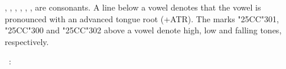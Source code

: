 \begin{refsection}
\begin{problem}{\langnameBari}{\nameJPetr}{}
\begin{assgts}
\item \fillblanks
\end{assgts}

\begin{tblsWarning}
, , , , , ,  are consonants. A line below a vowel denotes that the vowel is pronounced with an advanced tongue root (+ATR). The marks {\char"25CC\char"301}, {\char"25CC\char"300} and {\char"25CC\char"302} above a vowel denote high, low and falling tones, respectively.
\end{tblsWarning}
\end{problem}

\begin{problem}{\langnameTicuna}{\nameTKobayashi}{}
\IntroWordComb{\langnameTicuna}\ \IntroAndEnglish: 
\begin{center}
    


\end{center}
\end{problem}
\end{refsection}
